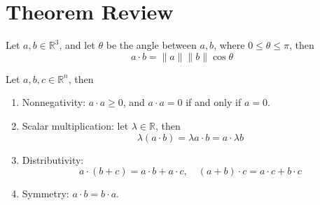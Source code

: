 \documentclass[openany]{book}
\newcommand{\R}{\mathbb{R}}
\begin{document}




































\chapter{Theorem Review}



\begin{prop}\label{dot}
    Let $a,b\in\R^3$, and let $\theta$ be the angle between $a,b$, where $0\leq\theta\leq\pi$, then 
    \begin{equation*}
        a\cdot b=\|a\|\|b\|\cos\theta
    \end{equation*}
\end{prop}




\begin{prop}
    Let $a,b,c\in\R^n$, then 
    \begin{enumerate}
        \item[(a)] Nonnegativity: $a\cdot a\geq 0$, and $a\cdot a=0$ if and only if $a=0$.
        \item[(b)] Scalar multiplication: let $\lambda\in\R$, then 
        \begin{equation*}
            \lambda(a\cdot b)=\lambda a\cdot b=a\cdot \lambda b
        \end{equation*}
        \item[(c)] Distributivity:
        \begin{equation*}
            a\cdot(b+c)=a\cdot b+a\cdot c, \quad (a+b)\cdot c=a\cdot c+b\cdot c
        \end{equation*}
        \item[(d)] Symmetry: $a\cdot b=b\cdot a$.
    \end{enumerate}
\end{prop}
\end{document}
